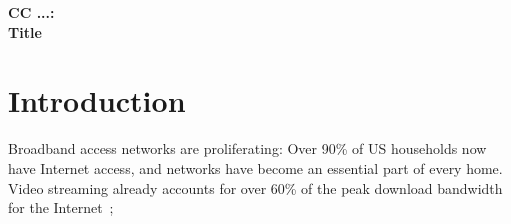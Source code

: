 \begin{center}
{\large \bf CC ...: \\ Title}
\end{center}

\section{Introduction}

Broadband access networks are proliferating: Over 90\% of US households
now have Internet access, and networks have become an essential part of
every home.  Video streaming already accounts for over 60\% of the peak
download bandwidth for the Internet~\cite{www-bismark};
